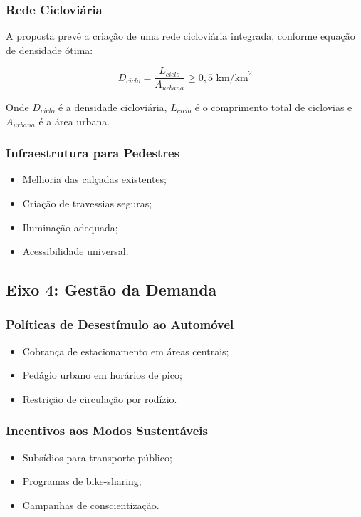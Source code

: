 \subsubsection{Rede Cicloviária}
A proposta prevê a criação de uma rede cicloviária integrada, conforme equação de densidade ótima:

\begin{equation}
D_{ciclo} = \frac{L_{ciclo}}{A_{urbana}} \geq 0,5 \text{ km/km}^2
\label{eq:densidade-ciclo}
\end{equation}

Onde $D_{ciclo}$ é a densidade cicloviária, $L_{ciclo}$ é o comprimento total de ciclovias e $A_{urbana}$ é a área urbana.

\subsubsection{Infraestrutura para Pedestres}
\begin{itemize}
    \item Melhoria das calçadas existentes;
    \item Criação de travessias seguras;
    \item Iluminação adequada;
    \item Acessibilidade universal.
\end{itemize}

\subsection{Eixo 4: Gestão da Demanda}

\subsubsection{Políticas de Desestímulo ao Automóvel}
\begin{itemize}
    \item Cobrança de estacionamento em áreas centrais;
    \item Pedágio urbano em horários de pico;
    \item Restrição de circulação por rodízio.
\end{itemize}

\subsubsection{Incentivos aos Modos Sustentáveis}
\begin{itemize}
    \item Subsídios para transporte público;
    \item Programas de bike-sharing;
    \item Campanhas de conscientização.
\end{itemize}

